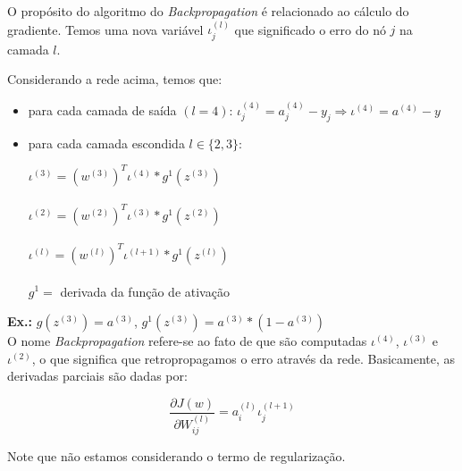 O propósito do algoritmo do \emph{Backpropagation} é relacionado ao cálculo do gradiente. Temos uma nova variável $\iota_j^{(l)}$ que significado o erro do nó $j$ na camada $l$.

Considerando a rede acima, temos que:

\begin{itemize}
\item para cada camada de saída $(l = 4)$: $\iota_j^{(4)} = a_j^{(4)} - y_j \Rightarrow \iota^{(4)} = a^{(4)} - y$	
\item para cada camada escondida $l \in \{2,3\}$:
	\begin{center}
	$\iota^{(3)} = (w^{(3)})^T \iota^{(4)} \ast g^1(z^{(3)})$
	\\~\\
	$\iota^{(2)} = (w^{(2)})^T \iota^{(3)} \ast g^1(z^{(2)})$
	\\~\\
	$\iota^{(l)} = (w^{(l)})^T \iota^{(l+1)} \ast g^1(z^{(l)})$
	\\~\\
	$g^1 = $ derivada da função de ativação
	\end{center}
\end{itemize}

\textbf{Ex.:} $g(z^{(3)}) = a^{(3)}$, $g^1(z^{(3)}) = a^{(3)} \ast (1 - a^{(3)})$\\

O nome \emph{Backpropagation} refere-se ao fato de que são computadas $\iota^{(4)}$, $\iota^{(3)}$ e $\iota^{(2)}$, o que significa que retropropagamos o erro através da rede. Basicamente, as derivadas parciais são dadas por:

\begin{equation}
\frac{\partial J(w)}{\partial W_{ij}^{(l)}} = a_i^{(l)} \iota_j^{(l+1)}	
\end{equation}

Note que não estamos considerando o termo de regularização.






